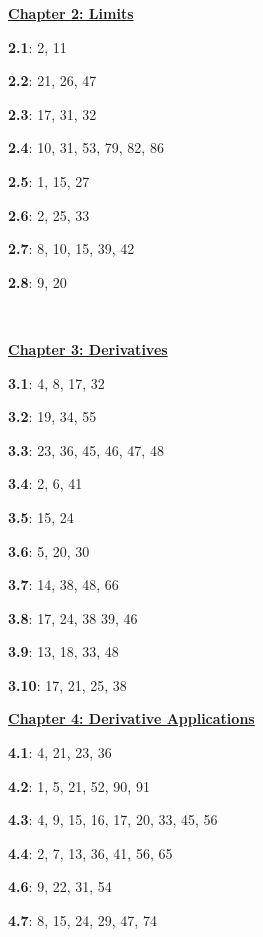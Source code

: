 \documentclass{siproblemset}
\begin{document}
    \begin{multicols*}{2}
        \underline{\textbf{Chapter 2: Limits}}
        
        \textbf{2.1}: 2, 11
        
        \textbf{2.2}: 21, 26, 47
        
        \textbf{2.3}: 17, 31, 32
        
        \textbf{2.4}: 10, 31, 53, 79, 82, 86
        
        \textbf{2.5}: 1, 15, 27
        
        \textbf{2.6}: 2, 25, 33
        
        \textbf{2.7}: 8, 10, 15, 39, 42
        
        \textbf{2.8}: 9, 20
        
        \ \linebreak
        
        \underline{\textbf{Chapter 3: Derivatives}}
        
        \textbf{3.1}: 4, 8, 17, 32
        
        \textbf{3.2}: 19, 34, 55
        
        \textbf{3.3}: 23, 36, 45, 46, 47, 48
        
        \textbf{3.4}: 2, 6, 41
        
        \textbf{3.5}: 15, 24
        
        \textbf{3.6}: 5, 20, 30
        
        \textbf{3.7}: 14, 38, 48, 66
        
        \textbf{3.8}: 17, 24, 38 39, 46
        
        \textbf{3.9}: 13, 18, 33, 48
        
        \textbf{3.10}: 17, 21, 25, 38
        
        \columnbreak
        
        \underline{\textbf{Chapter 4: Derivative Applications}}
        
        \textbf{4.1}: 4, 21, 23, 36
        
        \textbf{4.2}: 1, 5, 21, 52, 90, 91
        
        \textbf{4.3}: 4, 9, 15, 16, 17, 20, 33, 45, 56
        
        \textbf{4.4}: 2, 7, 13, 36, 41, 56, 65
        
        \textbf{4.6}: 9, 22, 31, 54
        
        \textbf{4.7}: 8, 15, 24, 29, 47, 74
        

\end{multicols*}
\end{document}
